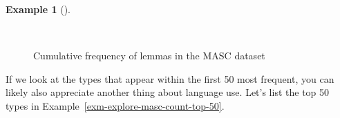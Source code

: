 \documentclass[
  letterpaper,
]{latex/krantz}
\theoremstyle{definition}
\newtheorem{example}{Example}[chapter]
\theoremstyle{remark}
\begin{document}
\begin{example}[]\protect\hypertarget{exm-explore-masc-count-cumulative}{}\label{exm-explore-masc-count-cumulative}

~

\begin{figure}[!htb]


\caption{\label{fig-explore-masc-count-cumulative}Cumulative frequency
of lemmas in the MASC dataset}

\end{figure}%

\end{example}

If we look at the types that appear within the first 50 most frequent,
you can likely also appreciate another thing about language use. Let's
list the top 50 types in Example~\ref{exm-explore-masc-count-top-50}.
\end{document}
